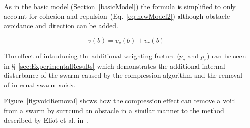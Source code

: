 \documentclass[12pt,a4paper]{IEEEtran}
\begin{document}

As in the basic model (Section~\ref{basicModel}) the formula is simplified to only account for cohesion and repulsion~(Eq.~\ref{eq:newModel2}) although obstacle avoidance and direction can be added.

\begin{equation}\label{eq:newModel2}
v(b) = v_c(b) + v_r(b)
\end{equation}

The effect of introducing the additional weighting factors ($p_c$ and $p_r$) can be seen in \S~\ref{sec:ExperimentalResults} which demonstrates the additional internal disturbance of the swarm caused by the compression algorithm and the removal of internal swarm voids. 

Figure~\ref{fig:voidRemoval} shows how the compression effect can remove a void from a swarm by surround an obstacle in a similar manner to the method described by Eliot et al. in~\cite{eliot2019void}.
\end{document}
